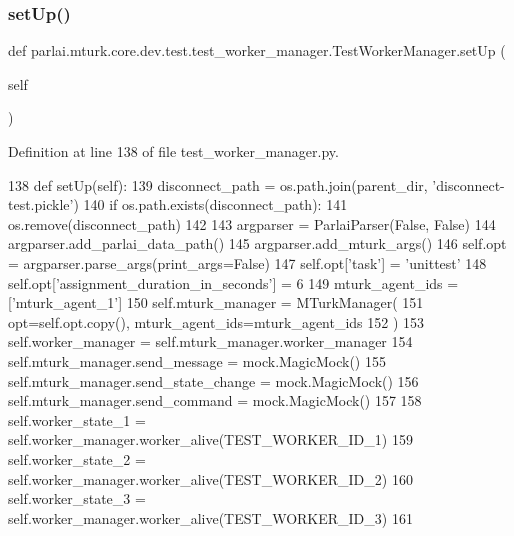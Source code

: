 \subsubsection{\texorpdfstring{set\+Up()}{setUp()}}
{\footnotesize\ttfamily def parlai.\+mturk.\+core.\+dev.\+test.\+test\+\_\+worker\+\_\+manager.\+Test\+Worker\+Manager.\+set\+Up (\begin{DoxyParamCaption}\item[{}]{self }\end{DoxyParamCaption})}



Definition at line 138 of file test\+\_\+worker\+\_\+manager.\+py.


\begin{DoxyCode}
138     \textcolor{keyword}{def }setUp(self):
139         disconnect\_path = os.path.join(parent\_dir, \textcolor{stringliteral}{'disconnect-test.pickle'})
140         \textcolor{keywordflow}{if} os.path.exists(disconnect\_path):
141             os.remove(disconnect\_path)
142 
143         argparser = ParlaiParser(\textcolor{keyword}{False}, \textcolor{keyword}{False})
144         argparser.add\_parlai\_data\_path()
145         argparser.add\_mturk\_args()
146         self.opt = argparser.parse\_args(print\_args=\textcolor{keyword}{False})
147         self.opt[\textcolor{stringliteral}{'task'}] = \textcolor{stringliteral}{'unittest'}
148         self.opt[\textcolor{stringliteral}{'assignment\_duration\_in\_seconds'}] = 6
149         mturk\_agent\_ids = [\textcolor{stringliteral}{'mturk\_agent\_1'}]
150         self.mturk\_manager = MTurkManager(
151             opt=self.opt.copy(), mturk\_agent\_ids=mturk\_agent\_ids
152         )
153         self.worker\_manager = self.mturk\_manager.worker\_manager
154         self.mturk\_manager.send\_message = mock.MagicMock()
155         self.mturk\_manager.send\_state\_change = mock.MagicMock()
156         self.mturk\_manager.send\_command = mock.MagicMock()
157 
158         self.worker\_state\_1 = self.worker\_manager.worker\_alive(TEST\_WORKER\_ID\_1)
159         self.worker\_state\_2 = self.worker\_manager.worker\_alive(TEST\_WORKER\_ID\_2)
160         self.worker\_state\_3 = self.worker\_manager.worker\_alive(TEST\_WORKER\_ID\_3)
161 
\end{DoxyCode}
\mbox{\label{classparlai_1_1mturk_1_1core_1_1dev_1_1test_1_1test__worker__manager_1_1TestWorkerManager_ab6ce44d19a57151491c6aa40f3c02401}} 
